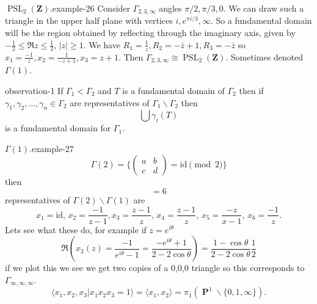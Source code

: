 \documentclass[10pt,]{book}
\numberwithin{equation}{section}
\newcommand{\ZZ}{\mathbf{Z}}
\newcommand{\id}{\mathrm{id}}
\DeclareMathOperator{\PP}{\mathbf{P}}
\DeclareMathOperator{\PSL}{PSL}
\newcommand{\lt}{<}
\newcommand{\amp}{&}
\begin{document}
\begin{example}{\(\PSL_2(\ZZ)\).}{example-26}%
\hypertarget{p-560}{}%
Consider \(\Gamma_{2,3,\infty}\) angles \(\pi/2, \pi/3, 0\). We can draw such a triangle in the upper half plane with vertices \(i, e^{\pi i/3}, \infty\). So a fundamental domain will be the region obtained by reflecting through the imaginary axis, given by \(-\frac 12 \le \Re z \le \frac 12\), \(|z| \ge 1\). We have \(R_1 = \frac{1}{\bar z}, R_2 = -\bar z +1,R_3 = -\bar z\) so \(x_1 = \frac{-1}{z}, x_2 = \frac{1}{-z+1}, x_3 = z+1\). Then \(\Gamma_{2,3,\infty} \cong \PSL_2(\ZZ)\). Sometimes denoted \(\Gamma(1)\).%
\end{example}
\begin{observation}{}{observation-1}%
\hypertarget{p-561}{}%
If \(\Gamma_1 \lt \Gamma_2\) and \(T\) is a fundamental domain of \(\Gamma_2\) then if \(\gamma_1, \gamma_2, \ldots, \gamma_n \in \Gamma_2\) are representatives of \(\Gamma_1\backslash \Gamma_2\) then%
\begin{equation*}
\bigcup \gamma_i (T)
\end{equation*}
is a fundamental domain for \(\Gamma_1\).%
\end{observation}
\begin{example}{\(\Gamma(1)\).}{example-27}%
\hypertarget{p-562}{}%
%
\begin{equation*}
\Gamma(2) = \{\begin{pmatrix} a\amp b \\ c\amp d\end{pmatrix} = \id \pmod 2 \}
\end{equation*}
then%
\begin{equation*}
[\Gamma(1) : \Gamma(2)] = 6
\end{equation*}
representatives of \(\Gamma(2) \backslash \Gamma(1)\) are%
\begin{equation*}
x_1 = \id,\,x_2 = \frac{-1}{z-1}, x_3 = \frac{z-1}{z},\, x_4 = \frac{z-1}{z},\,x_5 = \frac{-z}{x-1},\,x_6 = \frac{-1}{z}\text{.}
\end{equation*}
Lets see what these do, for example if \(z= e^{i\theta}\)%
\begin{equation*}
\Re(x_2(z) = \frac{-1}{e^{i\theta} - 1} = \frac{-e^{i\theta} + 1}{2- 2\cos \theta}) = \frac{1-\cos \theta}{ 2- 2\cos \theta} \frac 12
\end{equation*}
if we plot this we see we get two copies of a 0,0,0 triangle so this corresponds to \(\Gamma_{\infty,\infty,\infty}\).%
\begin{equation*}
\langle x_1, x_2, x_3 | x_1x_2x_3 = 1\rangle = \langle x_1,x_2\rangle = \pi_1(\PP^1\smallsetminus\{0,1,\infty\})\text{.}
\end{equation*}
%
\end{example}
\end{document}

